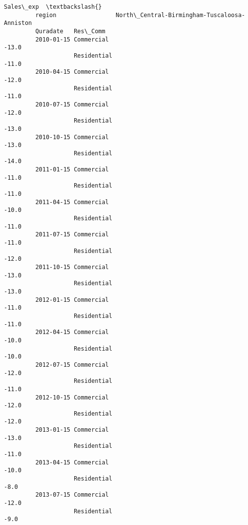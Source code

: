 \documentclass[11pt]{article}
\begin{document}
\begin{Verbatim}[commandchars=\\\{\}]
                                                                   Sales\_exp  \textbackslash{}
         region                 North\_Central-Birmingham-Tuscaloosa-Anniston   
         Quradate   Res\_Comm                                                   
         2010-01-15 Commercial                                         -13.0   
                    Residential                                        -11.0   
         2010-04-15 Commercial                                         -12.0   
                    Residential                                        -11.0   
         2010-07-15 Commercial                                         -12.0   
                    Residential                                        -13.0   
         2010-10-15 Commercial                                         -13.0   
                    Residential                                        -14.0   
         2011-01-15 Commercial                                         -11.0   
                    Residential                                        -11.0   
         2011-04-15 Commercial                                         -10.0   
                    Residential                                        -11.0   
         2011-07-15 Commercial                                         -11.0   
                    Residential                                        -12.0   
         2011-10-15 Commercial                                         -13.0   
                    Residential                                        -13.0   
         2012-01-15 Commercial                                         -11.0   
                    Residential                                        -11.0   
         2012-04-15 Commercial                                         -10.0   
                    Residential                                        -10.0   
         2012-07-15 Commercial                                         -12.0   
                    Residential                                        -11.0   
         2012-10-15 Commercial                                         -12.0   
                    Residential                                        -12.0   
         2013-01-15 Commercial                                         -13.0   
                    Residential                                        -11.0   
         2013-04-15 Commercial                                         -10.0   
                    Residential                                         -8.0   
         2013-07-15 Commercial                                         -12.0   
                    Residential                                         -9.0   

\end{Verbatim}
\end{document}

